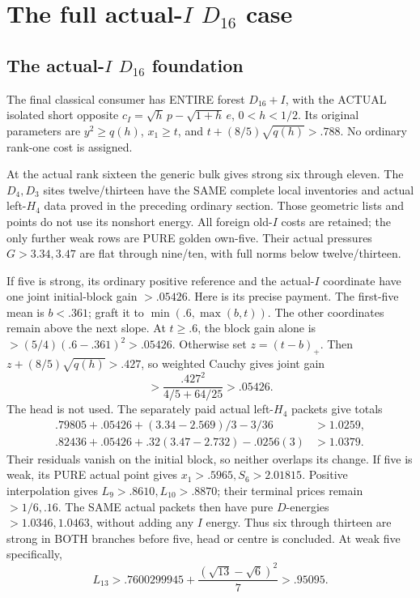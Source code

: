 \documentclass[11pt]{article}
\begin{document}
\section[The full actual-I D16 case]{The full actual-\(I\) \(D_{16}\) case}
\label{app:arithD16Icase}
\subsection[The actual-I D16 foundation]{The actual-\(I\) \(D_{16}\) foundation}
\label{app:arithD16Ifoundation}

The final classical consumer has ENTIRE
forest \(D_{16}+I\), with the ACTUAL
isolated short opposite
\(c_I=\sqrt h\,p-\sqrt{1+h}\,e\),
\(0<h<1/2\).
Its original parameters are
\(y^2\ge q(h)\), \(x_1\ge t\), and
\(t+(8/5)\sqrt{q(h)}>.788\).
No ordinary rank-one cost is assigned.

At the actual rank sixteen the generic
bulk gives strong six through eleven.
The \(D_4,D_3\) sites twelve/thirteen
have the SAME complete local inventories
and actual left-\(H_4\) data proved in
the preceding ordinary section.
Those geometric lists and points do
not use its nonshort energy.
All foreign old-\(I\) costs are retained;
the only further weak rows are PURE
golden own-five.
Their actual pressures \(G>3.34,3.47\)
are flat through nine/ten, with full
norms below twelve/thirteen.

If five is strong, its ordinary positive
reference and the actual-\(I\) coordinate
have one joint initial-block gain \(>.05426\).
Here is its precise payment.
The first-five mean is \(b<.361\);
graft it to \(\min(.6,\max(b,t))\).
The other coordinates remain above the
next slope.
At \(t\ge.6\), the block gain alone
is \(>(5/4)(.6-.361)^2>.05426\).
Otherwise set \(z=(t-b)_+\).
Then \(z+(8/5)\sqrt{q(h)}>.427\),
so weighted Cauchy gives joint gain
\[
                      >{\frac{.427^2}{4/5+64/25}}>.05426 .
\]
The head is not used.
The separately paid actual left-\(H_4\)
packets give totals
\[
\begin{aligned}
 .79805+.05426+(3.34-2.569)/3-3/36&>1.0259,\\
 .82436+.05426+.32(3.47-2.732)-.0256(3)&>1.0379 .
\end{aligned}
\]
Their residuals vanish on the initial
block, so neither overlaps its change.
If five is weak, its PURE actual point
gives \(x_1>.5965,S_6>2.01815\).
Positive interpolation gives
\(L_9>.8610,L_{10}>.8870\);
their terminal prices remain \(>1/6,.16\).
The SAME actual packets then have pure
\(D\)-energies \(>1.0346,1.0463\),
without adding any \(I\) energy.
Thus six through thirteen are strong
in BOTH branches before five, head or
centre is concluded.
At weak five specifically,
\[
                 L_{13}>
 .7600299945+{\frac{(\sqrt{13}-\sqrt6)^2}{7}}>.95095 .
\]
\end{document}
